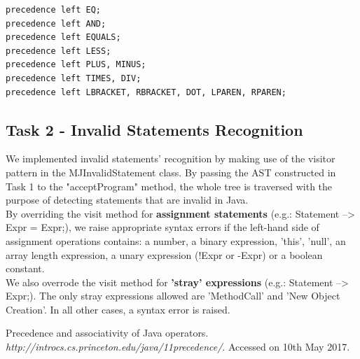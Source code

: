 \documentclass[paper=a4, fontsize=11pt]{scrartcl}
\numberwithin{equation}{section}		%
\numberwithin{figure}{section}			%
\numberwithin{table}{section}				%
\begin{document}
\begin{lstlisting}
precedence left EQ;
precedence left AND;
precedence left EQUALS;
precedence left LESS;
precedence left PLUS, MINUS;
precedence left TIMES, DIV;
precedence left LBRACKET, RBRACKET, DOT, LPAREN, RPAREN;
\end{lstlisting}


\subsection*{Task 2 - Invalid Statements Recognition}

We implemented invalid statements' recognition by making use of the visitor pattern in the MJInvalidStatement class. By passing the AST constructed in Task 1 to  the "acceptProgram" method, the whole tree is traversed with the purpose of detecting statements that are invalid in Java.\\
By overriding the visit method for \textbf{assignment statements} (e.g.: Statement --> Expr = Expr;), we raise appropriate syntax errors if the left-hand side of assignment operations contains: a number, a binary expression, 'this', 'null', an array length expression, a unary expression (!Expr or -Expr) or a boolean constant.\\
We also overrode the visit method for \textbf{'stray' expressions} (e.g.: Statement --> Expr;). The only stray expressions allowed are 'MethodCall' and 'New Object Creation'. In all other cases, a syntax error is raised. 

\begin{thebibliography}{9}%
Precedence and associativity of Java operators. \textit{http://introcs.cs.princeton.edu/java/11precedence/}. Accessed on 10th May 2017.
\end{thebibliography}
\end{document}
